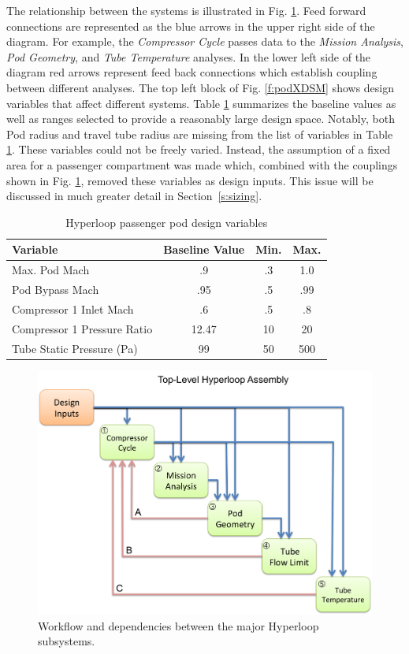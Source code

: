 \documentclass[heading.tex]{subfiles}
\begin{document}
The relationship between the systems is illustrated in Fig. \ref{f:hyperloopXDSM}. Feed forward connections 
are represented as the blue arrows in the upper right side of the diagram. For example, the \textit{Compressor Cycle} 
passes data to the \textit{Mission Analysis}, \textit{Pod Geometry}, and \textit{Tube Temperature} analyses. In the lower left 
side of the diagram red arrows represent feed back connections which establish coupling between different 
analyses. The top left block of Fig. \ref{f:podXDSM} shows design variables that affect 
different systems. Table \ref{tab:desvars} summarizes the baseline values as well as ranges selected 
to provide a reasonably large design space. Notably, both Pod radius and travel tube radius are missing 
from the list of variables in Table \ref{tab:desvars}. These variables could not be freely varied. Instead, the assumption of a fixed area for a passenger compartment was made which, combined with the couplings shown in Fig. \ref{f:hyperloopXDSM}, removed these variables as design inputs. This issue will be discussed in much greater detail in Section~\ref{s:sizing}.

\begin{table}
    \centering
    \caption{Hyperloop passenger pod design variables}
    \label{tab:desvars}
    \begin{tabular}{l  c  c  c} 
        \hline
        Variable & Baseline Value & Min. & Max. \\ \hline 
        Max. Pod Mach & .9 & .3 & 1.0 \\ 
        Pod Bypass Mach & .95 & .5 & .99 \\
        Compressor 1 Inlet Mach & .6 & .5 & .8 \\ 
        Compressor 1 Pressure Ratio & 12.47 & 10 & 20 \\ 
        Tube Static Pressure (Pa) & 99 & 50 & 500 \\ \hline
    \end{tabular}
\end{table}

\begin{figure}[hbtp]
\centering
\includegraphics[width=\textwidth]{images/TopAssembly.png}
\caption{Workflow and dependencies between the major Hyperloop subsystems.}
\label{f:hyperloopXDSM}
\end{figure}
\end{document}
